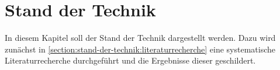 \chapter{Stand der Technik}\label{sectiom:stand-der-technik}

In diesem Kapitel soll der Stand der Technik dargestellt werden. Dazu wird zunächst in \autoref{section:stand-der-technik:literaturrecherche} eine systematische Literaturrecherche durchgeführt und die Ergebnisse dieser geschildert.


